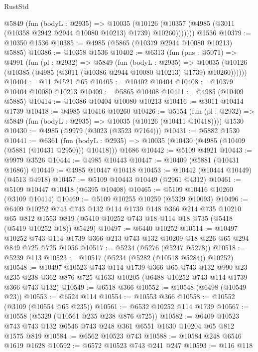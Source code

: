 \begin{lexlean}{RustStd}
\begin{coremodule}
        @5849
          (fun (bodyL : @2935) =>
          @10035
            (@10126 (@10357 (@4985 (@3011 (@10358 @2942 @2944 @10080 @10213) @1739) @10260)))))))
    @1536
@10379 := @10350 @1536
@10385 := @4985 (@5865 (@10379 @2944 @10080 @10213) @5885)
@10386 := @10358 @1536
@10402 := @6313
    (fun (pns : @5071) =>
    @4991
      (fun (pl : @2932) =>
      @5849
        (fun (bodyL : @2935) =>
        @10035 (@10126 (@10385 (@4985 (@3011 (@10386 @2944 @10080 @10213) @1739) @10260))))))
@10404 := @11 @1521 @65
@10405 := @10402 @10404
@10408 := @10379 @10404 @10080 @10213
@10409 := @5865 @10408
@10411 := @4985 (@10409 @5885)
@10414 := @10386 @10404 @10080 @10213
@10416 := @3011 @10414 @1739
@10418 := @4985 @10416 @10260
@10426 := @5154
    (fun (pl : @2932) => @5849 (fun (bodyL : @2935) => @10035 (@10126 (@10411 @10418))))
    @1530
@10430 := @4985 (@9979 (@3023 (@3523 @7164)))
@10431 := @5882 @1530
@10441 := @6361
    (fun (bodyL : @2935) => @10035 (@10430 (@4985 (@10409 (@5881 (@10431 @2950))) @10418)))
    @1686
@10442 := @5109 @4921
@10443 := @9979 @3526
@10444 := @4985 @10443
@10447 := @10409 (@5881 (@10431 @1686))
@10449 := @4985 @10447 @10418
@10453 := @10442 (@10444 @10449) (@4513 @4918)
@10457 := @5109 @10443 @10449 (@2961 @4312)
@10461 := @5109 @10447 @10418 (@6395 @10408)
@10465 := @5109 @10416 @10260 (@3109 @10414)
@10469 := @5109 @10255 @10259 (@5329 @10093)
@10496 := @6409
    @10252
    @743
    @743
    @132
    @114
    @1739
    @148
    @366
    @214
    @735
    @10210
    @65
    @812
    @1553
    @819
    (@5410 @10252 @743 @18 @114 @18 @735 (@5418 (@5419 @10252 @18)) @5429)
@10497 := @6440 @10252
@10514 := @10497
    @10252
    @743
    @114
    @1739
    @366
    @213
    @743
    @132
    @10209
    @18
    @226
    @65
    @294
    @849
    @725
    @725
    @1056
@10517 := @5234 (@5276 (@5247 @5278))
@10518 := @5239 @113
@10523 := @10517 (@5234 (@5282 (@10518 @5284)) @10252)
@10548 := @10497
    @10523
    @743
    @114
    @1739
    @366
    @65
    @743
    @132
    @990
    @23
    @235
    @238
    @362
    @876
    @725
    @1633
    @10205
    (@6488 @10252 @743 @114 @1739 @366 @743 @132)
@10549 := @6518 @366
@10552 := @10548 (@6498 (@10549 @23))
@10553 := @6524 @114
@10554 := @10553 @366
@10558 := @10552 (@3109 (@10554 @65 @235))
@10561 := @6532 @10252 @114 @1739
@10567 := @10558 (@5329 (@10561 @235 @238 @876 @725))
@10582 := @6409 @10523 @743 @743 @132 @6546 @743 @248 @361 @6551 @1630 @10204 @65 @812 @1575 @819
@10584 := @6562 @10523 @743
@10588 := @10584 @248 @6546 @1619 @1628
@10592 := @6572 @10523 @743 @241 @247
@10593 := @116 @118

\end{coremodule}
\end{lexlean}
